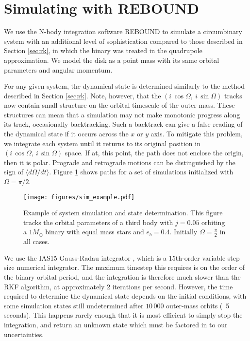 \documentclass[twocolumn]{aastex631}
\begin{document}
\section{Simulating with {\sc REBOUND}}
\label{sec:reb}

We use the N-body integration software {\sc REBOUND} \citep{rebound} to simulate a circumbinary system with an additional level of sophistication compared to those described in Section \ref{sec:rk}, in which the binary was treated in the quadrupole approximation. We model the disk as a point mass with its same orbital parameters and angular momentum.

For any given system, the dynamical state is determined similarly to the method described in Section \ref{sec:rk}. Note, however, that the $(i\,\cos{\Omega},~i\,\sin{\Omega})$ tracks now contain small structure on the orbital timescale of the outer mass. These structures can mean that a simulation may not make monotonic progress along its track, occasionally backtracking. Such a backtrack can give a false reading of the dynamical state if it occurs across the $x$ or $y$ axis. To mitigate this problem, we integrate each system until it returns to its original position in $(i\,\cos{\Omega},~i\,\sin{\Omega})$ space. If at, this point, the path does not enclose the origin, then it is polar. Prograde and retrograde motions can be distinguished by the sign of $\langle d\Omega/dt \rangle$. Figure \ref{fig:sim_example} shows paths for a set of simulations initialized with $\Omega = \pi/2$.

\begin{figure}
    \begin{centering}
        \texttt{[image: figures/sim\_example.pdf]}
        \caption{Example of system simulation and state determination. This figure tracks the orbital parameters
        of a third body with $j=0.05$ orbiting a $1 M_\odot$ binary with equal mass stars and $e_b = 0.4$.
        Initially $\Omega = \frac{\pi}{2}$ in all cases.}
        \label{fig:sim_example}
    \end{centering}
\end{figure}

We use the IAS15 Gauss-Radau integrator \citep{reboundias15}, which is a 15th-order variable step size numerical integrator. The maximum timestep this requires is on the order of the binary orbital period, and the integration is therefore much slower than the RKF algorithm, at approximately 2 iterations per second. However, the time required to determine the dynamical state depends on the initial conditions, with some simulation states still undetermined after $10\,000$ outer-mass orbits (~5 seconds). This happens rarely enough that it is most efficient to simply stop the integration, and return an unknown state which must be factored in to our uncertainties.
\end{document}
